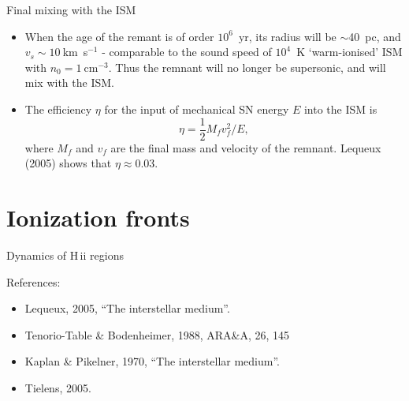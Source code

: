 \begin{frame}{Final mixing with the ISM}

\begin{itemize}

\item When the age of the remant is of order $10^6$~yr, its radius
  will be $\sim$40~pc, and $v_s \sim 10~$km~s$^{-1}$ - comparable to
  the sound speed of $10^4$~K `warm-ionised' ISM with $n_0 =
  1~$cm$^{-3}$. Thus the remnant will no longer be supersonic, and
  will mix with the ISM. 

\item The efficiency $\eta$ for the input of mechanical SN energy $E$
  into the ISM is 
\[ \eta = \frac{1}{2} M_f v_f^2  / E  , \]
where $M_f$ and $v_f$ are the final mass and velocity of the
remnant. Lequeux (2005) shows that $\eta \approx 0.03$.

\end{itemize}

\end{frame}


\section{Ionization fronts}




\begin{frame}{Dynamics of H\,{\sc ii} regions}


References: 

\begin{itemize}

\item Lequeux,  2005, ``The interstellar medium''.
\item Tenorio-Table \& Bodenheimer, 1988, ARA\&A, 26, 145
\item Kaplan \& Pikelner, 1970, ``The interstellar medium''.
\item Tielens, 2005. 
\end{itemize}

\end{frame}




